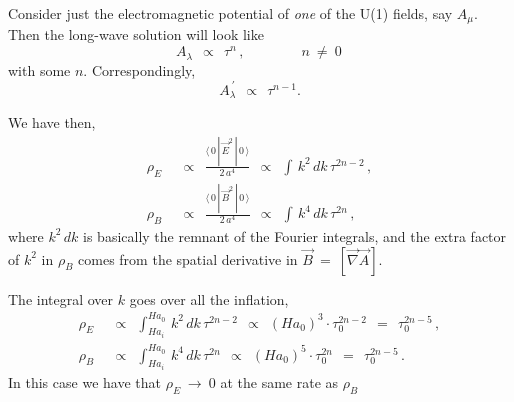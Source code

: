 \documentclass[12pt]{article}
\def\beq{\begin{equation}}
\def\eeq{\end{equation}}
\begin{document}
	Consider just the electromagnetic potential of {\it one} of the U(1) fields, say $ A_\mu $.
	Then the long-wave solution will look like
\beq
	A_\lambda    ~~\propto~~    \tau^n\,,  \qquad\qquad n ~\neq~ 0\,
\eeq	
	with some $ n $.
	Correspondingly,
\beq
	A_\lambda^{~\prime}  ~~\propto~~  \tau^{n-1}.
\eeq

	We have then,
\begin{align}
%
	\rho_E  &  ~~\propto~~  \frac{\langle\, 0\, |\, \vec{E}^2\, |\, 0\, \rangle}{ 2\, a^4  }  ~~\propto~~  \int\, k^2\, dk\,  \tau^{2n-2} \,,
	\\
%
	\rho_B  &  ~~\propto~~  \frac{\langle\, 0\, |\, \vec{B}^2\, |\, 0\, \rangle}{ 2\, a^4 }  ~~\propto~~  \int\, k^4\, dk\,  \tau^{2n}\,,
\end{align}
	where $ k^2\, dk $ is basically the remnant of the Fourier integrals, and
	the extra factor of $ k^2 $ in $ \rho_B $ comes from the spatial derivative in $ \vec{B}  ~=~  [\vec{\nabla} \vec{A}] $.

	The integral over $ k $ goes over all the inflation,
\begin{align}
%
	\rho_E  &  ~~\propto~~  \int_{H a_i}^{H a_0}\, k^2\, dk\,  \tau^{2n-2}  
		~~\propto~~  (H  a_0)^3 \cdot \tau_0^{2n-2}  ~~=~~  \tau_0^{2n-5}\,,  \\
%
	\rho_B  &  ~~\propto~~  \int_{H a_i}^{H a_0}\, k^4\, dk\,  \tau^{2n}
		~~\propto~~  (H  a_0)^5 \cdot \tau_0^{2n}  ~~=~~  \tau_0^{2n-5}\,.
\end{align}
	In this case we have that $ \rho_E ~\to~ 0 $ at the same rate as $ \rho_B $

%
\end{document}
